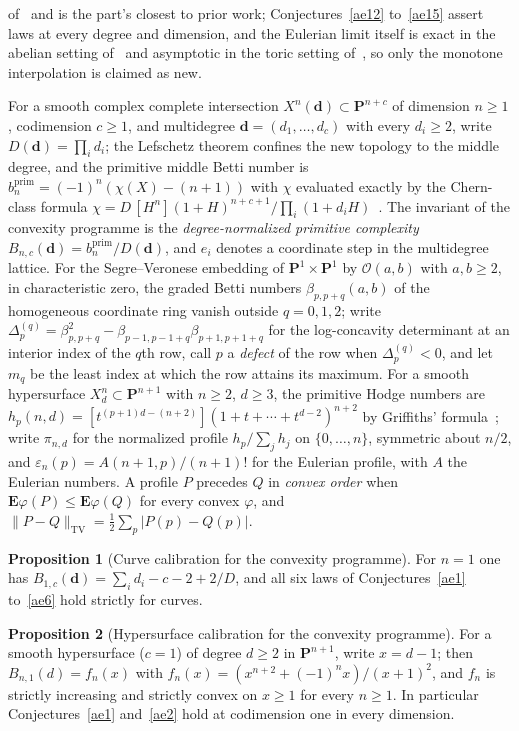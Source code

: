 \documentclass[11pt]{article}
\theoremstyle{definition}
\newtheorem{proposition}{Proposition}
\begin{document}
of~\cite{BCEGLY22} and is the part's closest to prior work; Conjectures~\ref{ae12} to~\ref{ae15} assert laws at every degree and dimension, and the Eulerian limit itself is exact in the abelian setting of~\cite{LS25} and asymptotic in the toric setting of~\cite{DK86}, so only the monotone interpolation is claimed as new.

For a smooth complex complete intersection $X^n(\mathbf d)\subset\mathbf P^{n+c}$ of dimension $n\ge1$, codimension $c\ge1$, and multidegree $\mathbf d=(d_1,\ldots,d_c)$ with every $d_i\ge2$, write $D(\mathbf d)=\prod_id_i$; the Lefschetz theorem confines the new topology to the middle degree, and the primitive middle Betti number is $b_n^{\mathrm{prim}}=(-1)^n(\chi(X)-(n+1))$ with $\chi$ evaluated exactly by the Chern-class formula $\chi=D\,[H^n](1+H)^{n+c+1}/\prod_i(1+d_iH)$~\cite{GL02,CO74}.  The invariant of the convexity programme is the \emph{degree-normalized primitive complexity} $B_{n,c}(\mathbf d)=b_n^{\mathrm{prim}}/D(\mathbf d)$, and $e_i$ denotes a coordinate step in the multidegree lattice.  For the Segre--Veronese embedding of $\mathbf P^1\times\mathbf P^1$ by $\mathcal O(a,b)$ with $a,b\ge2$, in characteristic zero, the graded Betti numbers $\beta_{p,p+q}(a,b)$ of the homogeneous coordinate ring vanish outside $q=0,1,2$; write $\Delta^{(q)}_p=\beta_{p,p+q}^2-\beta_{p-1,p-1+q}\beta_{p+1,p+1+q}$ for the log-concavity determinant at an interior index of the $q$th row, call $p$ a \emph{defect} of the row when $\Delta^{(q)}_p<0$, and let $m_q$ be the least index at which the row attains its maximum.  For a smooth hypersurface $X^n_d\subset\mathbf P^{n+1}$ with $n\ge2$, $d\ge3$, the primitive Hodge numbers are $h_p(n,d)=[t^{(p+1)d-(n+2)}](1+t+\cdots+t^{d-2})^{n+2}$ by Griffiths' formula~\cite{Gri69}; write $\pi_{n,d}$ for the normalized profile $h_p/\sum_jh_j$ on $\{0,\ldots,n\}$, symmetric about $n/2$, and $\varepsilon_n(p)=A(n+1,p)/(n+1)!$ for the Eulerian profile, with $A$ the Eulerian numbers.  A profile $P$ precedes $Q$ in \emph{convex order} when $\mathbf E\varphi(P)\le\mathbf E\varphi(Q)$ for every convex $\varphi$, and $\|P-Q\|_{\mathrm{TV}}=\tfrac12\sum_p|P(p)-Q(p)|$.

\begin{proposition}[Curve calibration for the convexity programme]\label{ae:curve}
For $n=1$ one has $B_{1,c}(\mathbf d)=\sum_id_i-c-2+2/D$, and all six laws of Conjectures~\ref{ae1} to~\ref{ae6} hold strictly for curves.
\end{proposition}

\begin{proposition}[Hypersurface calibration for the convexity programme]\label{ae:hyper}
For a smooth hypersurface ($c=1$) of degree $d\ge2$ in $\mathbf P^{n+1}$, write $x=d-1$; then $B_{n,1}(d)=f_n(x)$ with $f_n(x)=(x^{n+2}+(-1)^nx)/(x+1)^2$, and $f_n$ is strictly increasing and strictly convex on $x\ge1$ for every $n\ge1$.  In particular Conjectures~\ref{ae1} and~\ref{ae2} hold at codimension one in every dimension.
\end{proposition}
\end{document}

